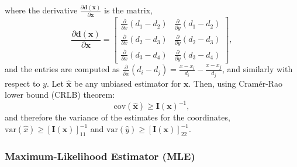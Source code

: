 \documentclass[11pt]{article}
\newcommand{\bd}{\mathbf{d}}
\newcommand{\bx}{\mathbf{x}}
\newcommand{\bI}{\mathbf{I}}
\begin{document}
where the derivative $\displaystyle \frac{\partial \bd(\bx)}{\partial \bx}$ is the matrix,
\begin{equation}
	\frac{\partial \bd(\bx)}{\partial \bx} = \begin{bmatrix}
		\frac{\partial}{\partial x} (d_{1} - d_{2}) & \frac{\partial}{\partial y} (d_{1} - d_{2}) \\
		\frac{\partial}{\partial x} (d_{2} - d_{3}) & \frac{\partial}{\partial y} (d_{2} - d_{3}) \\
		\frac{\partial}{\partial x} (d_{3} - d_{4}) & \frac{\partial}{\partial y} (d_{3} - d_{4})
	\end{bmatrix},
\label{eq:derivative}
\end{equation}
and the entries are computed as $\displaystyle \frac{\partial}{\partial x} (d_{i} - d_{j}) = \frac{x-x_{i}}{d_{i}} - \frac{x-x_{j}}{d_{j}}$, and similarly with respect to $y$. Let $\hat{\bx}$ be any unbiased estimator for $\bx$. Then, using Cram\'er-Rao lower bound (CRLB) theorem:
\begin{equation}
	\mathrm{cov}(\hat{\bx}) \geq \bI (\bx)^{-1},
\label{eq:crlb}
\end{equation}
and therefore the variance of the estimates for the coordinates, $\mathrm{var}(\hat{x}) \geq [\bI (\bx)]^{-1}_{11}$ and $\mathrm{var}(\hat{y}) \geq [\bI (\bx)]^{-1}_{22}$.


\subsubsection*{Maximum-Likelihood Estimator (MLE)}
\label{subsubsec:mle}
\end{document}
